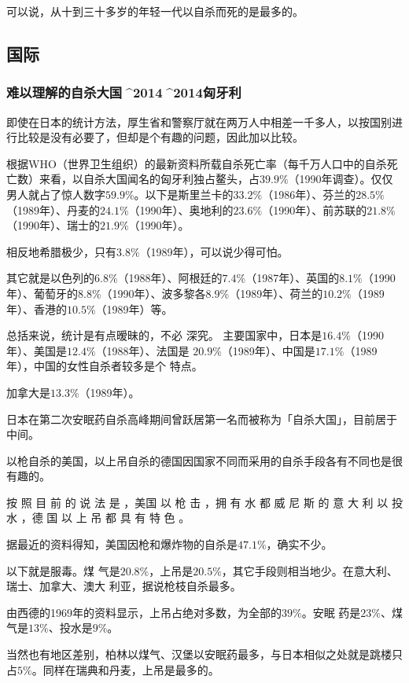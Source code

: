 \documentclass[UTF8]{ctexart}
\begin{document}
可以说，从十到三十多岁的年轻一代以自杀而死的是最多的。

\subsection{国际}

\subsubsection*{难以理解的自杀大国^^^^2014^^^^2014匈牙利}

即使在日本的统计方法，厚生省和警察厅就在两万人中相差一千多人，以按国别进行比较是没有必要了，但却是个有趣的问题，因此加以比较。

根据WHO（世界卫生组织）的最新资料所载自杀死亡率（每千万人口中的自杀死亡数）来看，以自杀大国闻名的匈牙利独占鳌头，占$39.9\%$（1990年调查）。仅仅男人就占了惊人数字$59.9\%$。以下是斯里兰卡的$33.2\%$（1986年）、芬兰的$28.5\%$（1989年）、丹麦的$24.1\%$（1990年）、奥地利的$23.6\%$（1990年）、前苏联的$21.8\%$（1990年）、瑞士的$21.9\%$（1990年）。

相反地希腊极少，只有$3.8\%$（1989年），可以说少得可怕。

其它就是以色列的$6.8\%$（1988年）、阿根廷的$7.4\%$（1987年）、英国的$8.1\%$（1990年）、葡萄牙的$8.8\%$（1990年）、波多黎各$8.9\%$（1989年）、荷兰的$10.2\%$（1989年）、香港的$10.5\%$（1989年）等。

总括来说，统计是有点暧昧的，不必 深究。 主要国家中，日本是$16.4\%$（1990年）、美国是$12.4\%$（1988年）、法国是 $20.9\%$（1989年）、中国是$17.1\%$（1989年），中国的女性自杀者较多是个 特点。

加拿大是$13.3\%$（1989年）。

日本在第二次安眠药自杀高峰期间曾跃居第一名而被称为「自杀大国」，目前居于中间。

以枪自杀的美国，以上吊自杀的德国因国家不同而采用的自杀手段各有不同也是很有趣的。

按 照 目 前 的 说 法 是 ，美国 以 枪 击 ，拥 有 水 都 威 尼 斯 的 意 大 利 以 投 水 ，德 国 以 上 吊 都 具 有 特 色 。

据最近的资料得知，美国因枪和爆炸物的自杀是$47.1\%$，确实不少。

以下就是服毒。煤 气是$20.8\%$，上吊是$20.5\%$，其它手段则相当地少。在意大利、瑞士、加拿大、澳大 利亚，据说枪枝自杀最多。

由西德的1969年的资料显示，上吊占绝对多数，为全部的$39\%$。安眠 药是$23\%$、煤气是$13\%$、投水是$9\%$。

当然也有地区差别，柏林以煤气、汉堡以安眠药最多，与日本相似之处就是跳楼只占$5\%$。同样在瑞典和丹麦，上吊是最多的。
\end{document}
